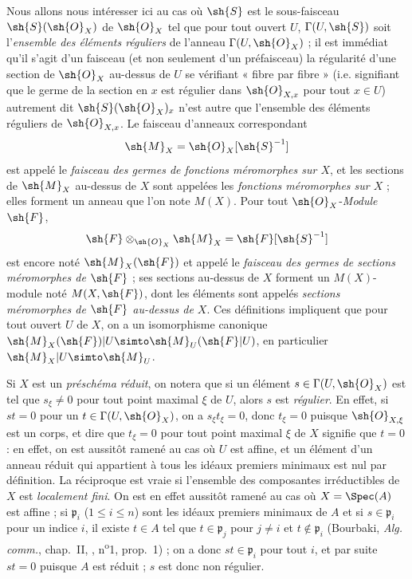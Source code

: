 \begin{env}[20.1.3]
Nous allons nous intéresser ici au cas où $\sh{S}$ est le sous-faisceau $\sh{S}(\sh{O}_X)$ de $\sh{O}_X$ tel que pour tout ouvert $U$, $\Gamma(U,\sh{S})$ soit l'\emph{ensemble des éléments réguliers} de l'anneau $\Gamma(U,\sh{O}_X)$ ; il est immédiat qu'il s'agit d'un faisceau (et non seulement d'un préfaisceau) la régularité d'une section de $\sh{O}_X$ au-dessus de $U$ se vérifiant « fibre par fibre » (i.e. signifiant que le germe de la section en $x$ est régulier dans $\sh{O}_{X,x}$ pour tout $x\in U$) autrement dit $\sh{S}(\sh{O}_X)_x$ n'est autre que l'ensemble des éléments réguliers de $\sh{O}_{X,x}$.
Le faisceau d'anneaux correspondant
\[
  \sh{M}_X=\sh{O}_X[\sh{S}^{-1}]
\]
est appelé le \emph{faisceau des germes de fonctions méromorphes sur $X$}, et les sections de $\sh{M}_X$ au-dessus de $X$ sont appelées les \emph{fonctions méromorphes sur $X$} ; elles forment un anneau que l'on note $M(X)$.
Pour tout $\sh{O}_X$-\emph{Module} $\sh{F}$,
\[
  \sh{F}\otimes_{\sh{O}_X}\sh{M}_X=\sh{F}[\sh{S}^{-1}]
\]
est encore noté $\sh{M}_X(\sh{F})$ et appelé le \emph{faisceau des germes de sections méromorphes de $\sh{F}$} ; ses sections au-dessus de $X$ forment un $M(X)$-module noté $M(X,\sh{F})$, dont les éléments sont appelés \emph{sections méromorphes de $\sh{F}$ au-dessus de $X$}.
Ces définitions impliquent que pour tout ouvert $U$ de $X$, on a un isomorphisme canonique $\sh{M}_X(\sh{F})|U\simto\sh{M}_U(\sh{F}|U)$, en particulier $\sh{M}_X|U\simto\sh{M}_U$.
\end{env}

\begin{env}[20.1.3.1]
\label{IV.20.1.3.1}
Si $X$ est un \emph{préschéma réduit}, on notera que si un élément $s\in\Gamma(U,\sh{O}_X)$ est tel que $s_\xi\neq0$ pour tout point maximal $\xi$ de $U$, alors $s$ est \emph{régulier}.
En effet, si $st=0$ pour un $t\in\Gamma(U,\sh{O}_X)$, on a $s_\xi t_\xi=0$, donc $t_\xi=0$ puisque $\sh{O}_{X,\xi}$ est un corps, et dire que $t_\xi=0$ pour tout point maximal $\xi$ de $X$ signifie que $t=0$ : en effet, on est aussitôt ramené au cas où $U$ est affine, et un élément d'un anneau réduit qui appartient à tous les idéaux premiers minimaux est nul par définition.
La réciproque est vraie si l'ensemble des composantes irréductibles de $X$ est \emph{localement fini}.
On est en effet aussitôt ramené au cas où $X=\Spec(A)$ est affine ; si $\mathfrak p_i$ ($1\leq i\leq n$) sont les idéaux premiers minimaux de $A$ et si $s\in\mathfrak p_i$ pour un indice $i$, il existe $t\in A$ tel que $t\in\mathfrak p_j$ pour $j\neq i$ et $t\notin\mathfrak p_i$ (Bourbaki, \emph{Alg. comm.}, chap.~II, , n\textsuperscript{o}1, prop.~1) ; on a donc $st\in\mathfrak p_i$ pour tout $i$, et par suite $st=0$ puisque $A$ est réduit ; $s$ est donc non régulier.
\end{env}

